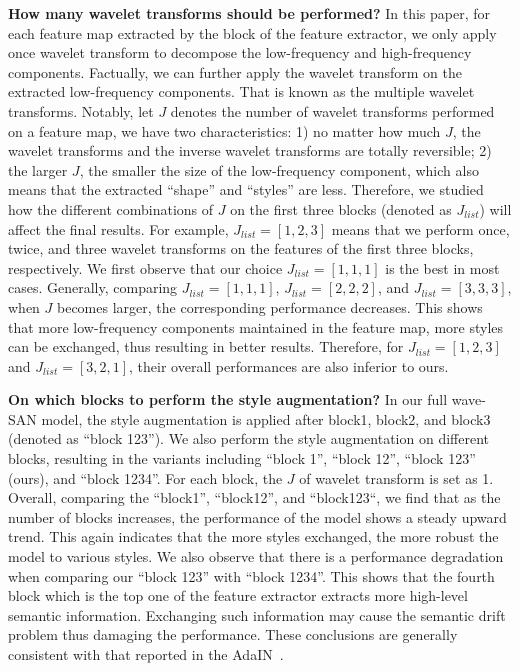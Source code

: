 \documentclass{article}
\begin{document}
	\noindent\textbf{How many wavelet transforms should be performed?} In this paper, for each feature map extracted by the block of the feature extractor, we only apply once wavelet transform to decompose the low-frequency and high-frequency components. Factually, we can further apply the wavelet transform on the extracted low-frequency components. That is known as the multiple wavelet transforms. Notably, let $J$ denotes the number of wavelet transforms performed on a feature map, we have two characteristics: 1) no matter how much $J$, the wavelet transforms and the inverse wavelet transforms are totally reversible; 2) the larger $J$, the smaller the size of the low-frequency component, which also means that the extracted ``shape'' and ``styles'' are less. Therefore, we studied how the different combinations of $J$ on the first three blocks (denoted as $J_{list}$) will affect the final results. For example, $J_{list} = [1, 2, 3]$ means that we perform once, twice, and three wavelet transforms on the features of the first three blocks, respectively.
	We first observe that our choice $J_{list} = [1, 1, 1]$ is the best in most cases. Generally, comparing $J_{list} = [1, 1, 1]$, $J_{list} = [2, 2, 2]$, and $J_{list} = [3, 3, 3]$, when $J$ becomes larger, the corresponding performance decreases. This shows that more low-frequency components maintained in the feature map, more styles can be exchanged, thus resulting in better results. Therefore, for $J_{list} = [1, 2, 3]$ and $J_{list} = [3, 2, 1]$, their overall performances are also inferior to ours.
	

	\noindent\textbf{On which blocks to perform the style augmentation?} In our full wave-SAN model, the style augmentation is applied after block1, block2, and block3 (denoted as ``block 123''). We also perform the style augmentation on different blocks, resulting in the variants including ``block 1'', ``block 12'', ``block 123'' (ours), and ``block 1234''. For each block, the $J$ of wavelet transform is set as 1. Overall, comparing the ``block1'', ``block12'', and ``block123``, we find that as the number of blocks increases, the performance of the model shows a steady upward trend. This again indicates that the more styles exchanged, the more robust the model to various styles. We also observe that there is a performance degradation when comparing our ``block 123'' with ``block 1234''. This shows that the fourth block which is the top one of the feature extractor extracts more high-level semantic information. Exchanging such information may cause the semantic drift problem thus damaging the performance. These conclusions are generally consistent with that reported in the AdaIN~\cite{huang2017arbitrary}.
	
\end{document}
